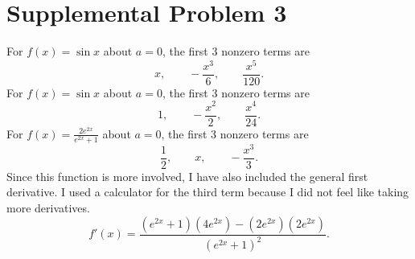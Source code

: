 \documentclass[11pt, letterpaper]{report}
\begin{document}
\section*{Supplemental Problem 3}
\begin{solution}
	For $f(x)=\sin x$ about $a=0$, the first 3 nonzero terms are
	\[
		x,\qquad -\frac{x^3}{6},\qquad \frac{x^5}{120}
	.\]
	For $f(x)=\sin x$ about $a=0$, the first 3 nonzero terms are
	\[
		1,\qquad -\frac{x^2}{2},\qquad \frac{x^4}{24}
	.\]
	For $f(x)=\frac{2e^{2x}}{e^{2x}+1}$ about $a=0$, the first 3 nonzero terms are
	\[
		\frac{1}{2},\qquad x,\qquad -\frac{x^3}{3}
	.\]
	Since this function is more involved, I have also included the general first derivative. I used a calculator for the third term because I did not feel like taking more derivatives.
	\[
		f'(x)=\frac{\left( e^{2x}+1 \right) \left( 4e^{2x} \right) -\left( 2e^{2x} \right) \left( 2e^{2x} \right) }{\left( e^{2x}+1 \right) ^2}
	.\]
	
\end{solution}
\end{document}
